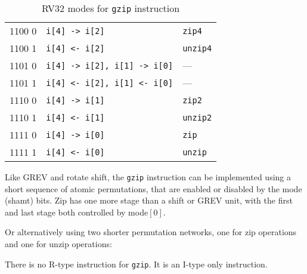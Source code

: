 \begin{table}[h]
\begin{small}
\begin{center}
\begin{tabular}{c l l}
\hline

      1100 0  & {\tt i[4] -> i[2]}               & {\tt zip4} \\
      1100 1  & {\tt i[4] <- i[2]}               & {\tt unzip4} \\
      1101 0  & {\tt i[4] -> i[2], i[1] -> i[0]} & --- \\
      1101 1  & {\tt i[4] <- i[2], i[1] <- i[0]} & --- \\
      1110 0  & {\tt i[4] -> i[1]}               & {\tt zip2} \\
      1110 1  & {\tt i[4] <- i[1]}               & {\tt unzip2} \\
      1111 0  & {\tt i[4] -> i[0]}               & {\tt zip} \\
      1111 1  & {\tt i[4] <- i[0]}               & {\tt unzip} \\
\end{tabular}
\end{center}
\end{small}
\caption{RV32 modes for {\tt gzip} instruction}
\label{gzip-modes}
\end{table}

Like GREV and rotate shift, the {\tt gzip} instruction can be implemented using a short
sequence of atomic permutations, that are enabled or disabled by the mode (shamt)
bits. Zip has one more stage than a shift or GREV unit, with the first and last stage
both controlled by mode$[0]$.



Or alternatively using two shorter permutation networks, one for zip operations
and one for unzip operations:



There is no R-type instruction for {\tt gzip}. It is an I-type only instruction.

